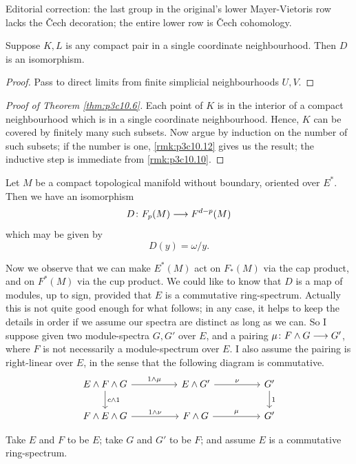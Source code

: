 \documentclass[../main]{subfiles}
\begin{document}
\noindent Editorial correction: the last group in the original's lower Mayer-Vietoris row lacks the \v{C}ech decoration; the entire lower row is \v{C}ech cohomology.
\begin{remark}\label{rmk:p3c10.12}
Suppose $K,L$ is any compact pair in a single coordinate neighbourhood. Then $D$ is an isomorphism.
\end{remark}
\begin{proof}
Pass to direct limits from finite simplicial neighbourhoods $U,V$.
\end{proof}
\begin{proof}[Proof of Theorem \ref{thm:p3c10.6}]
Each point of $K$ is in the interior of a compact neighbourhood which is in a single coordinate neighbourhood. Hence, $K$ can be covered by finitely many such subsets. Now argue by induction on the number of such subsets; if the number is one, \ref{rmk:p3c10.12} gives us the result; the inductive step is immediate from \ref{rmk:p3c10.10}.
\end{proof}
\begin{corollary}\label{cor:p3c10.13}
Let $M$ be a compact topological manifold without boundary, oriented over $E^*$. Then we have an isomorphism
\[D \colon F_p(M) \longrightarrow F^{d-p}(M)\]
which may be given by
\[D(y) = \omega / y.\]
\end{corollary}
Now we observe that we can make $E^*(M)$ act on $F_*(M)$ via the cap product, and on $F^*(M)$ via the cup product. We could like to know that $D$ is a map of modules, up to sign, provided that $E$ is a commutative ring-spectrum. Actually this is not quite good enough for what follows; in any case, it helps to keep the details in order if we assume our spectra are distinct as long as we can. So I suppose given two module-spectra $G,G'$ over $E$, and a pairing $\mu \colon F \wedge G \longrightarrow G'$, where $F$ is not necessarily a module-spectrum over $E$. I also assume the pairing is right-linear over $E$, in the sense that the following diagram is commutative.
\[
\begin{tikzcd}
E\wedge F \wedge G \arrow[rr, "1 \wedge \mu"] \arrow[d, "c \wedge 1"] &  & E\wedge G' \arrow[rr, "\nu"] &  & G' \arrow[d, "1"] \\
F \wedge E \wedge G \arrow[rr, "1 \wedge \nu"]                        &  & F\wedge G \arrow[rr, "\mu"]  &  & G'               
\end{tikzcd}
\]
\begin{examples}
Take $E$ and $F$ to be $E$; take $G$ and $G'$ to be $F$; and assume $E$ is a commutative ring-spectrum.
\end{examples}
\end{document}
